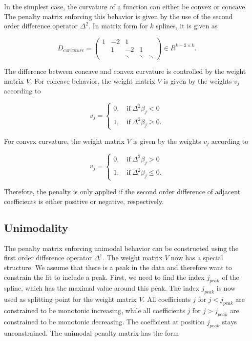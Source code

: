 In the simplest case, the curvature of a function can either be convex or concave. The penalty matrix  enforcing this behavior is given by the use of the second order difference operator $\Delta^2$. In matrix form for $k$ splines, it is given as

$$D_{curvature} = \begin{pmatrix} 1 & -2 & 1 \\ & 1 &-2 &1 \\ & & \ddots & \ddots & \ddots  \end{pmatrix} \in R^{k-2 \times k}.$$

The difference between concave and convex curvature is controlled by the weight matrix $V$. For concave behavior, the weight matrix $V$ is given by the weights $v_j$ according to

$$v_j = \begin{cases} 0, \quad \text{if} \ \Delta^2\beta_j < 0 \\ 1, \quad \text{if} \ \Delta^2\beta_j \ge 0. \end{cases}$$

For convex curvature, the weight matrix $V$ is given by the weights $v_j$ according to

$$v_j = \begin{cases} 0, \quad \text{if} \ \Delta^2\beta_j > 0 \\ 1, \quad \text{if} \ \Delta^2\beta_j \le 0. \end{cases}$$

Therefore, the penalty is only applied if the second order difference of adjacent coefficients is either positive or negative, respectively. \cite{eilers2005unimodal}

\subsection{Unimodality}

The penalty matrix enforcing unimodal behavior can be constructed using the first order difference operator $\Delta^1$. The weight matrix $V$ now has a special structure. We assume that there is a peak in the data and therefore want to constrain the fit to include a peak. First, we need to find the index $j_{peak}$ of the spline, which has the maximal value around this  peak. The index $j_{peak}$ is now used as splitting point for the weight matrix $V$. All coefficients $j$ for $j < j_{peak}$ are constrained to be monotonic increasing, while all coefficients $j$ for $j > j_{peak}$ are constrained to be monotonic decreasing. The coefficient at position $j_{peak}$ stays unconstrained. \cite{eilers2005unimodal} The unimodal penalty matrix has the form 

